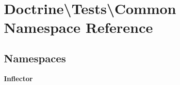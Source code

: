 \section{Doctrine\textbackslash{}Tests\textbackslash{}Common Namespace Reference}
\label{namespace_doctrine_1_1_tests_1_1_common}
\subsection*{Namespaces}
\begin{DoxyCompactItemize}
\item 
 {\bf Inflector}
\end{DoxyCompactItemize}
